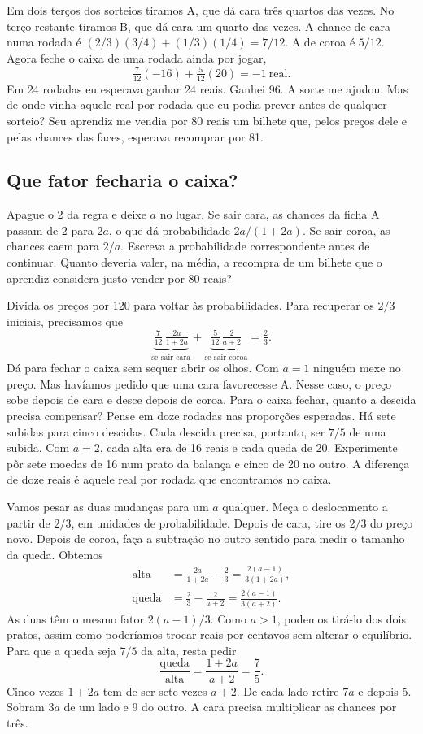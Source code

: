 \documentclass[12pt,oneside]{article}
\newcommand{\secao}[1]{\Needspace{5.2\baselineskip}\subsection*{#1}}
\begin{document}
Em dois terços dos sorteios tiramos A, que dá cara três quartos das vezes. No terço restante tiramos B, que dá cara um quarto das vezes. A chance de cara numa rodada é $(2/3)(3/4)+(1/3)(1/4)=7/12$. A de coroa é $5/12$. Agora feche o caixa de uma rodada ainda por jogar,
\[
    \tfrac{7}{12}(-16)+\tfrac{5}{12}(20)=-1\ \text{real}.
\]
Em 24 rodadas eu esperava ganhar 24 reais. Ganhei 96. A sorte me ajudou. Mas de onde vinha aquele real por rodada que eu podia prever antes de qualquer sorteio? Seu aprendiz me vendia por 80 reais um bilhete que, pelos preços dele e pelas chances das faces, esperava recomprar por 81.

\secao{Que fator fecharia o caixa?}
Apague o 2 da regra e deixe $a$ no lugar. Se sair cara, as chances da ficha A passam de $2$ para $2a$, o que dá probabilidade $2a/(1+2a)$. Se sair coroa, as chances caem para $2/a$. Escreva a probabilidade correspondente antes de continuar. Quanto deveria valer, na média, a recompra de um bilhete que o aprendiz considera justo vender por 80 reais?

Divida os preços por 120 para voltar às probabilidades. Para recuperar os $2/3$ iniciais, precisamos que
\[
\underbrace{\tfrac{7}{12}\,\tfrac{2a}{1+2a}}_{\text{se sair cara}}
+\underbrace{\tfrac{5}{12}\,\tfrac{2}{a+2}}_{\text{se sair coroa}}
=\tfrac{2}{3}.
\]
Dá para fechar o caixa sem sequer abrir os olhos. Com $a=1$ ninguém mexe no preço. Mas havíamos pedido que uma cara favorecesse A. Nesse caso, o preço sobe depois de cara e desce depois de coroa. Para o caixa fechar, quanto a descida precisa compensar? Pense em doze rodadas nas proporções esperadas. Há sete subidas para cinco descidas. Cada descida precisa, portanto, ser $7/5$ de uma subida. Com $a=2$, cada alta era de 16 reais e cada queda de 20. Experimente pôr sete moedas de 16 num prato da balança e cinco de 20 no outro. A diferença de doze reais é aquele real por rodada que encontramos no caixa.

Vamos pesar as duas mudanças para um $a$ qualquer. Meça o deslocamento a partir de $2/3$, em unidades de probabilidade. Depois de cara, tire os $2/3$ do preço novo. Depois de coroa, faça a subtração no outro sentido para medir o tamanho da queda. Obtemos
\[
 \begin{aligned}
 \text{alta}&=\frac{2a}{1+2a}-\frac23=\frac{2(a-1)}{3(1+2a)},\\[4pt]
 \text{queda}&=\frac23-\frac{2}{a+2}=\frac{2(a-1)}{3(a+2)}.
 \end{aligned}
\]
As duas têm o mesmo fator $2(a-1)/3$. Como $a>1$, podemos tirá-lo dos dois pratos, assim como poderíamos trocar reais por centavos sem alterar o equilíbrio. Para que a queda seja $7/5$ da alta, resta pedir
\[
 \frac{\text{queda}}{\text{alta}}=\frac{1+2a}{a+2}=\frac75.
\]
Cinco vezes $1+2a$ tem de ser sete vezes $a+2$. De cada lado retire $7a$ e depois 5. Sobram $3a$ de um lado e 9 do outro. A cara precisa multiplicar as chances por três.
\end{document}

